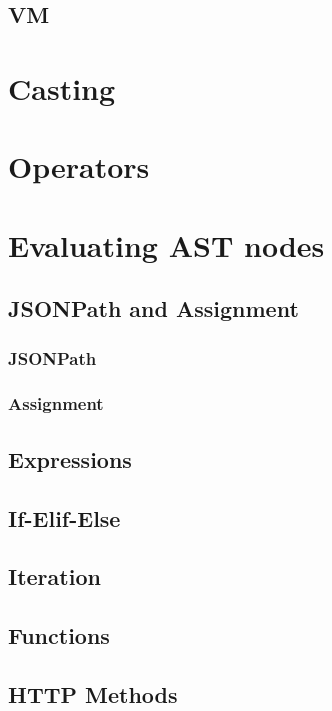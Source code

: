 \documentclass[]{full}
\theoremstyle{definition}
\begin{document}
\subsection{VM}

\section{Casting}

\section{Operators}

\section{Evaluating AST nodes}

\subsection{JSONPath and Assignment}

\subsubsection{JSONPath}

\subsubsection{Assignment}

\subsection{Expressions}

\subsection{If-Elif-Else}

\subsection{Iteration}

\subsection{Functions}

\subsection{HTTP Methods}
\end{document}
